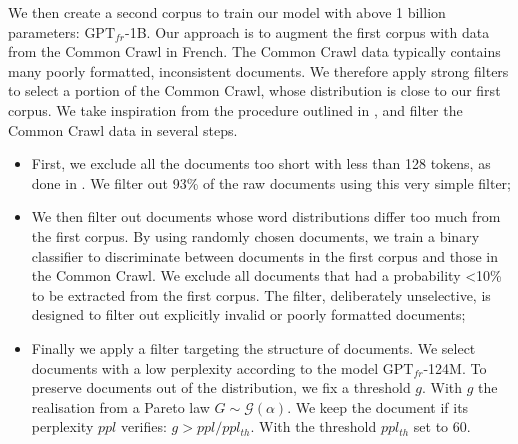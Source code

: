 We then create a second corpus to train our model with above 1 billion parameters: $\text{GPT}_{fr}$-1B. Our approach is to augment the first corpus with data from the Common Crawl in French. The Common Crawl data typically contains many poorly formatted, inconsistent documents. We therefore apply strong filters to select a portion of the Common Crawl, whose distribution is close to our first corpus. We take inspiration from the procedure outlined in \textcite{brown_20}, and filter the Common Crawl data in several steps.
\begin{itemize}
    \item First, we exclude all the documents too short with less than 128 tokens, as done in \textcite{shoeybi_19}. We filter out 93\% of the raw documents using this very simple filter; 
    \item We then filter out documents whose word distributions differ too much from the first corpus. By using  randomly chosen documents, we train a binary classifier to discriminate between documents in the first corpus and those in the Common Crawl. We exclude all documents that had a probability <10\% to be extracted from the first corpus. The filter, deliberately unselective, is designed to filter out explicitly invalid or poorly formatted documents;
    \item Finally we apply a filter targeting the structure of documents. We select documents with a low perplexity according to the model $\text{GPT}_{fr}$-124M. To preserve documents out of the distribution, we fix a threshold $g$. With $g$ the realisation from a Pareto law $G \sim \mathcal{G}(\alpha)$. We keep the document if its perplexity $ppl$ verifies: $g > ppl / ppl_{th}$. With the threshold $ppl_{th}$ set to $60$. 
\end{itemize}

